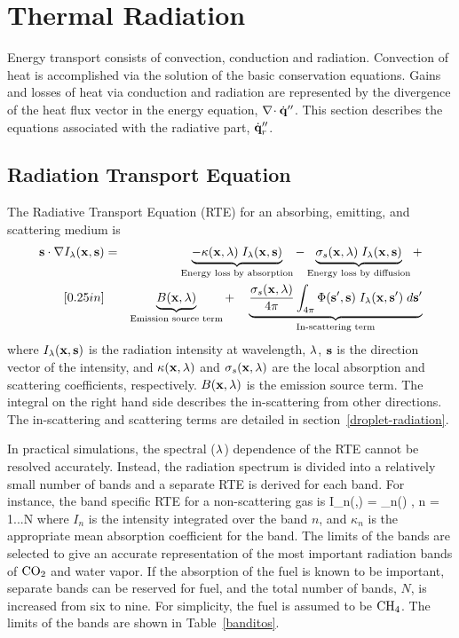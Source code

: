 \chapter{Thermal Radiation}
\label{chapter:radiation}

Energy transport consists of convection, conduction and
radiation. Convection of heat is accomplished via the solution of the
basic conservation equations. Gains and losses of heat via conduction
and radiation are represented by the divergence of the heat flux
vector in the energy equation, $\nabla\!\cdot \dot{\bf q}''$. This section
describes the equations associated with the radiative part, $\dot{\bf q}''_r$.

\section{Radiation Transport Equation}

The Radiative Transport Equation (RTE) for an absorbing, emitting, and scattering medium is
\begin{eqnarray}
{\bf s} \cdot \nabla I_{\lambda}({\bf x},{\bf s}) &=&
\underbrace{ - \kappa({\bf x},\lambda)   \; I_\lambda({\bf x},{\bf s}) }_{\textrm{Energy loss by absorption}} -
\underbrace{\sigma_s({\bf x},\lambda) \; I_\lambda({\bf x},{\bf s}) }_{\textrm{Energy loss by diffusion}} +  \nonumber  \\ [0.25in]
& & \underbrace{   B({\bf x},\lambda) }_{\textrm{Emission source term}} + \quad
\underbrace{   \frac{\sigma_s({\bf x},\lambda)}{4\pi}
\int_{4\pi}\Phi({\bf s}',{\bf s}) \; I_{\lambda}({\bf x},{\bf s}') \; d{\bf s}'
 }_{\textrm{In-scattering term}}
\label{RTEbasic}
\end{eqnarray}
where $I_{\lambda}({\bf x},{\bf s})$ is the radiation intensity at wavelength,
$\lambda$, ${\bf s}$ is the direction vector of the intensity, and
$\kappa({\bf x},\lambda)$ and $\sigma_s({\bf x},\lambda)$ are the local absorption
and scattering coefficients,
respectively. $B({\bf x},\lambda)$ is the emission source term.
The integral on the
right hand side describes the in-scattering from other directions. The in-scattering and scattering terms are detailed in section~\ref{droplet-radiation}.

In practical simulations, the spectral ($\lambda$) dependence of the RTE cannot be resolved
accurately. Instead, the radiation spectrum is divided into
a relatively small number of bands and a separate RTE is derived for
each band. For instance, the band specific RTE for a non-scattering gas is
\be   \bs \cdot \nabla I_n(\bx,\bs) = \kappa_n(\bx) \;
        \left[ I_{b,n}(\bx) - I_n(\bx,\bs) \right],\;\; n = 1...N
\label{bandRTE} \ee
where $I_n$ is the intensity integrated over the band $n$, and $\kappa_n$
is the appropriate mean absorption coefficient for the band.
The limits of the bands are selected to give an accurate
representation of the most important radiation bands of $\rm CO_2$ and
water vapor. If the absorption of the fuel is known to be important,
separate bands can be reserved for fuel, and the total number of
bands, $N$, is increased from six to nine.
For simplicity, the fuel is assumed to be $\rm CH_4$.
The limits of the bands are shown in Table~\ref{banditos}.

